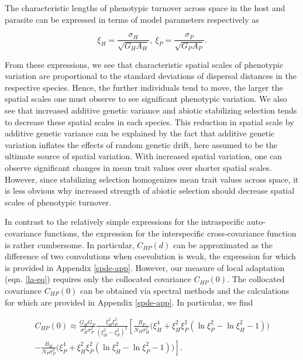 \documentclass{article}
\begin{document}
The characteristic lengths of phenotypic turnover across space in the
host and parasite can be expressed in terms of model parameters
respectively as

\begin{equation}\label{char-len}
  \xi_H = \frac{\sigma_H}{\sqrt{G_HA_H}}, \ \xi_P = \frac{\sigma_P}{\sqrt{G_PA_P}}.
\end{equation}

From these expressions, we see that characteristic spatial scales of
phenotypic variation are proportional to the standard deviations of
dispersal distances in the respective species. Hence, the further
individuals tend to move, the larger the spatial scales one must observe
to see significant phenotypic variation. We also see that increased
additive genetic variance and abiotic stabilizing selection tends to
decrease these spatial scales in each species. This reduction in spatial
scale by additive genetic variance can be explained by the fact that
additive genetic variation inflates the effects of random genetic drift,
here assumed to be the ultimate source of spatial variation. With
increased spatial variation, one can observe significant changes in mean
trait values over shorter spatial scales. However, since stabilizing
selection homogenizes mean trait values across space, it is less obvious
why increased strength of abiotic selection should decrease spatial
scales of phenotypic turnover.

In contrast to the relatively simple expressions for the intraspecific
auto-covariance functions, the expression for the interspecific
cross-covariance function is rather cumbersome. In particular,
\(C_{HP}(d)\) can be approximated as the difference of two convolutions
when coevolution is weak, the expression for which is provided in
Appendix \ref{spde-app}. However, our measure of local adaptation (eqn.
\ref{la-eq}) requires only the collocated covariance \(C_{HP}(0)\). The
collocated covariance \(C_{HP}(0)\) can be obtained via spectral methods
and the calculations for which are provided in Appendix \ref{spde-app}.
In particular, we find

\begin{multline}\label{collocated}
  C_{HP}(0)\approx \frac{G_HG_P}{\sigma_H^2\sigma_P^2}\frac{\xi_H^2\xi_P^2}{(\xi_H^2-\xi_P^2)^2}\left[\frac{B_P}{ N_H\sigma_H^2}\Big(\xi_H^4+\xi_H^2\xi_P^2(\ln\xi_P^2-\ln\xi_H^2-1)\Big)\right. \\
  \left.-\frac{B_H}{ N_P\sigma_P^2}\Big(\xi_P^4+\xi_H^2\xi_P^2(\ln\xi_H^2-\ln\xi_P^2-1)\Big)\right].
\end{multline}
\end{document}
